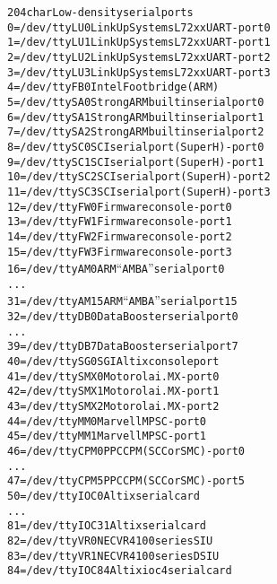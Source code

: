 \documentclass[a4paper,8pt,english]{sphinxmanual}
\begin{document}
\begin{alltt}
 204 char       Low-density serial ports
                  0 = /dev/ttyLU0               LinkUp Systems L72xx UART - port 0
                  1 = /dev/ttyLU1               LinkUp Systems L72xx UART - port 1
                  2 = /dev/ttyLU2               LinkUp Systems L72xx UART - port 2
                  3 = /dev/ttyLU3               LinkUp Systems L72xx UART - port 3
                  4 = /dev/ttyFB0               Intel Footbridge (ARM)
                  5 = /dev/ttySA0               StrongARM builtin serial port 0
                  6 = /dev/ttySA1               StrongARM builtin serial port 1
                  7 = /dev/ttySA2               StrongARM builtin serial port 2
                  8 = /dev/ttySC0               SCI serial port (SuperH) - port 0
                  9 = /dev/ttySC1               SCI serial port (SuperH) - port 1
                 10 = /dev/ttySC2               SCI serial port (SuperH) - port 2
                 11 = /dev/ttySC3               SCI serial port (SuperH) - port 3
                 12 = /dev/ttyFW0               Firmware console - port 0
                 13 = /dev/ttyFW1               Firmware console - port 1
                 14 = /dev/ttyFW2               Firmware console - port 2
                 15 = /dev/ttyFW3               Firmware console - port 3
                 16 = /dev/ttyAM0               ARM ``AMBA'' serial port 0
                    ...
                 31 = /dev/ttyAM15              ARM ``AMBA'' serial port 15
                 32 = /dev/ttyDB0               DataBooster serial port 0
                    ...
                 39 = /dev/ttyDB7               DataBooster serial port 7
                 40 = /dev/ttySG0               SGI Altix console port
                 41 = /dev/ttySMX0              Motorola i.MX - port 0
                 42 = /dev/ttySMX1              Motorola i.MX - port 1
                 43 = /dev/ttySMX2              Motorola i.MX - port 2
                 44 = /dev/ttyMM0               Marvell MPSC - port 0
                 45 = /dev/ttyMM1               Marvell MPSC - port 1
                 46 = /dev/ttyCPM0              PPC CPM (SCC or SMC) - port 0
                    ...
                 47 = /dev/ttyCPM5              PPC CPM (SCC or SMC) - port 5
                 50 = /dev/ttyIOC0              Altix serial card
                    ...
                 81 = /dev/ttyIOC31             Altix serial card
                 82 = /dev/ttyVR0               NEC VR4100 series SIU
                 83 = /dev/ttyVR1               NEC VR4100 series DSIU
                 84 = /dev/ttyIOC84             Altix ioc4 serial card

\end{alltt}
\end{document}
